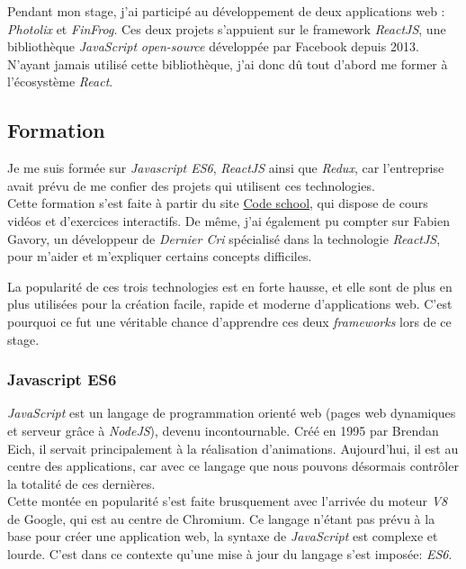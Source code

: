 \bigskip

Pendant mon stage, j'ai participé au développement de deux applications
web : \emph{Photolix} et \emph{FinFrog}. Ces deux projets s'appuient sur
le framework \emph{ReactJS}, une bibliothèque \emph{JavaScript}
\emph{open-source} développée par Facebook depuis 2013. N'ayant jamais
utilisé cette bibliothèque, j'ai donc dû tout d'abord me former à
l'écosystème \emph{React}.

\bigskip

\subsection{Formation}\label{formation}

\bigskip

Je me suis formée sur \emph{Javascript ES6}, \emph{ReactJS} ainsi que
\emph{Redux}, car l'entreprise avait prévu de me confier des projets qui
utilisent ces technologies.\\
Cette formation s'est faite à partir du site
\href{https://www.codeschool.com/}{Code school}, qui dispose de cours
vidéos et d'exercices interactifs. De même, j'ai également pu compter
sur Fabien Gavory, un développeur de \emph{Dernier Cri} spécialisé dans
la technologie \emph{ReactJS}, pour m'aider et m'expliquer certains
concepts difficiles.

\bigskip

La popularité de ces trois technologies est en forte hausse, et elle
sont de plus en plus utilisées pour la création facile, rapide et
moderne d'applications web. C'est pourquoi ce fut une véritable chance
d'apprendre ces deux \emph{frameworks} lors de ce stage.

\bigskip

\subsubsection{Javascript ES6}\label{javascript-es6}

\bigskip

\emph{JavaScript} est un langage de programmation orienté web (pages web
dynamiques et serveur grâce à \emph{NodeJS}), devenu incontournable.
Créé en 1995 par Brendan Eich, il servait principalement à la
réalisation d'animations. Aujourd'hui, il est au centre des
applications, car avec ce langage que nous pouvons désormais contrôler
la totalité de ces dernières.\\
Cette montée en popularité s'est faite brusquement avec l'arrivée du
moteur \emph{V8} de Google, qui est au centre de Chromium. Ce langage
n'étant pas prévu à la base pour créer une application web, la syntaxe
de \emph{JavaScript} est complexe et lourde. C'est dans ce contexte
qu'une mise à jour du langage s'est imposée: \emph{ES6}.

